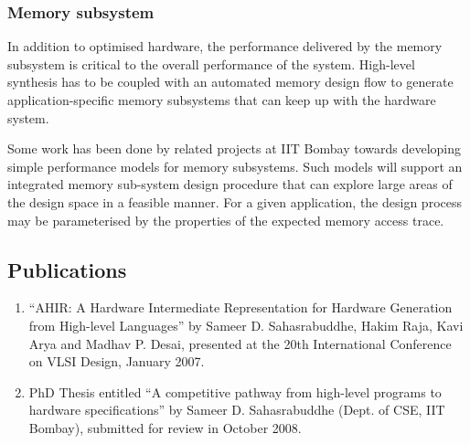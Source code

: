 \documentclass[12pt]{article}
\begin{document}
\subsubsection{Memory subsystem}

In addition to optimised hardware, the performance delivered by the
memory subsystem is critical to the overall performance of the system. 
High-level synthesis has to be coupled with an automated memory design
flow to generate application-specific memory subsystems that can keep
up with the hardware system.

Some work has been done by related projects at IIT Bombay towards
developing simple performance models for memory subsystems. Such
models will support an integrated memory sub-system design procedure
that can explore large areas of the design space in a feasible manner. 
For a given application, the design process may be parameterised by
the properties of the expected memory access trace.

\subsection{Publications}

\begin{enumerate}
\item ``AHIR: A Hardware Intermediate Representation for Hardware
      Generation from High-level Languages'' by Sameer D. 
      Sahasrabuddhe, Hakim Raja, Kavi Arya and Madhav P. Desai,
      presented at the 20th International Conference on VLSI Design,
      January 2007.
\item PhD Thesis entitled ``A competitive pathway from high-level
      programs to hardware specifications'' by Sameer D. Sahasrabuddhe
      (Dept. of CSE, IIT Bombay), submitted for review in October
      2008.
\end{enumerate}




\end{document}
